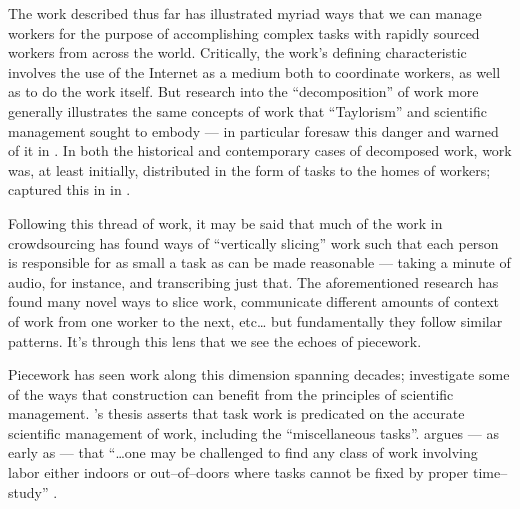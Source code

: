 \documentclass[trackingWork]{subfiles}
\begin{document}
The work described thus far has illustrated myriad ways that
we can manage workers for the purpose of accomplishing complex tasks with
rapidly sourced workers from across the world.
Critically, the work's defining characteristic involves
the use of the Internet as a medium both 
to coordinate workers, as well as
to do the work itself.
But research into the ``decomposition'' of work more generally
illustrates the same concepts of work that ``Taylorism''
and scientific management sought to embody
---
\citeauthor{professionalCrowdworkEthics} in particular foresaw this danger and warned of it in
\citeyear{professionalCrowdworkEthics}
\cite{crowdworkFuture,professionalCrowdworkEthics,nickerson2013crowd}.
In both the historical and contemporary cases of decomposed work,
work was,
at least initially,
distributed in the form of tasks to the homes of workers;
\citeauthor{riisOtherSideLives} captured this in
in \citeyear{riisOtherSideLives}
\cite{riisOtherSideLives}.

Following this thread of work, it may be said that
much of the work in crowdsourcing has found ways of ``vertically slicing'' work
such that each person is responsible for as small a task as can be made reasonable
--- taking a minute of audio, for instance, and transcribing just that.
The aforementioned research has found many novel ways to slice work,
communicate different amounts of context of work from one worker to the next,
etc\dots
but fundamentally they follow similar patterns.
It's through this lens that we see the echoes of piecework.


Piecework has seen work along this dimension spanning decades;
\citeauthor{thompson1913time} investigate some of the ways that
construction can benefit from the principles of scientific management.
\citeauthor{thompson1913time}'s thesis asserts that
task work is predicated on the accurate scientific management of work,
including the ``miscellaneous tasks''.
\citeauthor{thompson1913time} argues
--- as early as \citeyear{thompson1913time} ---
that ``\dots one may be challenged to find any class of work
involving labor either indoors or out--of--doors
where tasks cannot be fixed by proper time--study''
\cite{thompson1913time}.




\end{document}
